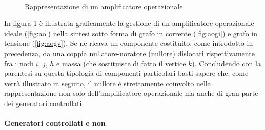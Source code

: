 \begin{figure}[b]
 \centering
 \\
 \hspace{50pt}
 \caption{Rappresentazione di un amplificatore operazionale}
 \label{fig:aocmp}
\end{figure}

In figura \ref{fig:aocmp} è illustrata graficamente la gestione di un amplificatore operazionale ideale (\ref{fig:ao}) nella sintesi sotto forma di grafo in corrente (\ref{fig:aogi}) e grafo in tensione (\ref{fig:aogv}). Se ne ricava un componente costituito, come introdotto in precedenza, da una coppia nullatore-noratore (nullore) dislocati rispettivamente fra i nodi $i$, $j$, $h$ e massa (che sostituisce di fatto il vertice $k$). Concludendo con la parentesi su questa tipologia di componenti particolari basti sapere che, come verrà illustrato in seguito, il nullore è strettamente coinvolto nella rappresentazione non solo dell'amplificatore operazionale ma anche di gran parte dei generatori controllati.

\paragraph{Generatori controllati e non}

